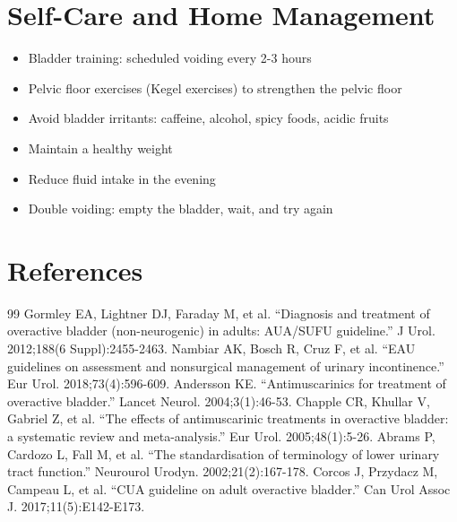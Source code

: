 \section*{Self-Care and Home Management}
\begin{itemize}
\item Bladder training: scheduled voiding every 2-3 hours
\item Pelvic floor exercises (Kegel exercises) to strengthen the pelvic floor
\item Avoid bladder irritants: caffeine, alcohol, spicy foods, acidic fruits
\item Maintain a healthy weight
\item Reduce fluid intake in the evening
\item Double voiding: empty the bladder, wait, and try again
\end{itemize}

\section*{References}
\begin{thebibliography}{99}
 Gormley EA, Lightner DJ, Faraday M, et al. ``Diagnosis and treatment of overactive bladder (non-neurogenic) in adults: AUA/SUFU guideline.'' J Urol. 2012;188(6 Suppl):2455-2463.
 Nambiar AK, Bosch R, Cruz F, et al. ``EAU guidelines on assessment and nonsurgical management of urinary incontinence.'' Eur Urol. 2018;73(4):596-609.
 Andersson KE. ``Antimuscarinics for treatment of overactive bladder.'' Lancet Neurol. 2004;3(1):46-53.
 Chapple CR, Khullar V, Gabriel Z, et al. ``The effects of antimuscarinic treatments in overactive bladder: a systematic review and meta-analysis.'' Eur Urol. 2005;48(1):5-26.
 Abrams P, Cardozo L, Fall M, et al. ``The standardisation of terminology of lower urinary tract function.'' Neurourol Urodyn. 2002;21(2):167-178.
 Corcos J, Przydacz M, Campeau L, et al. ``CUA guideline on adult overactive bladder.'' Can Urol Assoc J. 2017;11(5):E142-E173.
\end{thebibliography}
